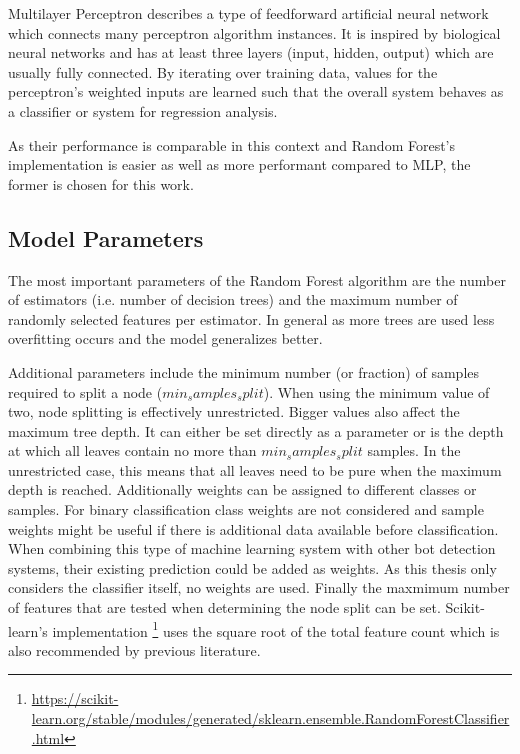 \documentclass[
    fontsize=12pt,
    headings=small,
    parskip=half,           %
    bibliography=totoc,
    numbers=noenddot,       %
    open=any,               %
    final                   %
]{scrreprt}
\begin{document}
Multilayer Perceptron describes a type of feedforward artificial neural network which connects many perceptron algorithm instances. It is inspired by biological neural networks and has at least three layers (input, hidden, output) which are usually fully connected. By iterating over training data, values for the perceptron's weighted inputs are learned such that the overall system behaves as a classifier or system for regression analysis.

As their performance is comparable in this context and Random Forest's implementation is easier as well as more performant compared to MLP, the former is chosen for this work.

\subsection{Model Parameters}

The most important parameters of the Random Forest algorithm are the number of estimators (i.e. number of decision trees) and the maximum number of randomly selected features per estimator. In general as more trees are used less overfitting occurs and the model generalizes better. \todo

Additional parameters include the minimum number (or fraction) of samples required to split a node ($min_samples_split$). When using the minimum value of two, node splitting is effectively unrestricted. Bigger values also affect the maximum tree depth. It can either be set directly as a parameter or is the depth at which all leaves contain no more than $min_samples_split$ samples. In the unrestricted case, this means that all leaves need to be pure when the maximum depth is reached. Additionally weights can be assigned to different classes or samples. For binary classification class weights are not considered and sample weights might be useful if there is additional data available before classification. When combining this type of machine learning system with other bot detection systems, their existing prediction could be added as weights. As this thesis only considers the classifier itself, no weights are used. Finally the maxmimum number of features that are tested when determining the node split can be set. Scikit-learn's implementation \footnote{\url{https://scikit-learn.org/stable/modules/generated/sklearn.ensemble.RandomForestClassifier.html}} uses the square root of the total feature count which is also recommended by previous literature. \cite{Hastie2009}
\end{document}
